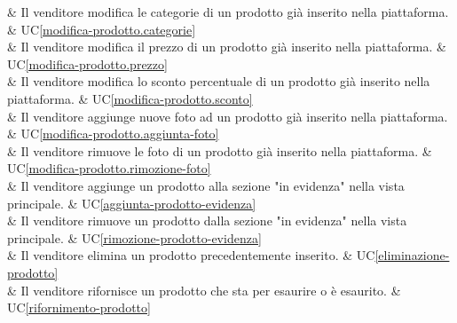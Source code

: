  & Il venditore modifica le categorie di un prodotto già inserito nella piattaforma. & UC\ref{modifica-prodotto.categorie} \\
    
 & Il venditore modifica il prezzo di un prodotto già inserito nella piattaforma. & UC\ref{modifica-prodotto.prezzo} \\
    
 & Il venditore modifica lo sconto percentuale di un prodotto già inserito nella piattaforma. & UC\ref{modifica-prodotto.sconto} \\
    
 & Il venditore aggiunge nuove foto ad un prodotto già inserito nella piattaforma. & UC\ref{modifica-prodotto.aggiunta-foto} \\
    
 & Il venditore rimuove le foto di un prodotto già inserito nella piattaforma. & UC\ref{modifica-prodotto.rimozione-foto} \\
    
 & Il venditore aggiunge un prodotto alla sezione "in evidenza" nella vista principale. & UC\ref{aggiunta-prodotto-evidenza} \\
    
 & Il venditore rimuove un prodotto dalla sezione "in evidenza" nella vista principale. & UC\ref{rimozione-prodotto-evidenza} \\
    
 & Il venditore elimina un prodotto precedentemente inserito. & UC\ref{eliminazione-prodotto} \\
    
 & Il venditore rifornisce un prodotto che sta per esaurire o è esaurito. & UC\ref{rifornimento-prodotto} \\